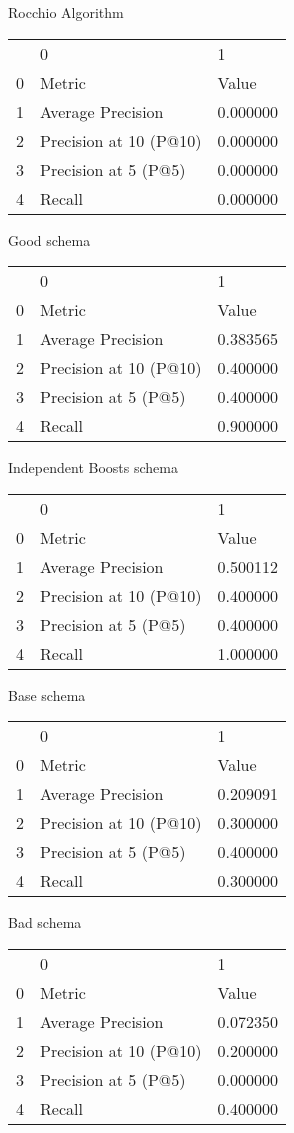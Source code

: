 

Rocchio Algorithm
\begin{tabular}{lll}
 & 0 & 1 \\
0 & Metric & Value \\
1 & Average Precision & 0.000000 \\
2 & Precision at 10 (P@10) & 0.000000 \\
3 & Precision at 5 (P@5) & 0.000000 \\
4 & Recall & 0.000000 \\
\end{tabular}


Good schema
\begin{tabular}{lll}
 & 0 & 1 \\
0 & Metric & Value \\
1 & Average Precision & 0.383565 \\
2 & Precision at 10 (P@10) & 0.400000 \\
3 & Precision at 5 (P@5) & 0.400000 \\
4 & Recall & 0.900000 \\
\end{tabular}


Independent Boosts schema
\begin{tabular}{lll}
 & 0 & 1 \\
0 & Metric & Value \\
1 & Average Precision & 0.500112 \\
2 & Precision at 10 (P@10) & 0.400000 \\
3 & Precision at 5 (P@5) & 0.400000 \\
4 & Recall & 1.000000 \\
\end{tabular}


Base schema
\begin{tabular}{lll}
 & 0 & 1 \\
0 & Metric & Value \\
1 & Average Precision & 0.209091 \\
2 & Precision at 10 (P@10) & 0.300000 \\
3 & Precision at 5 (P@5) & 0.400000 \\
4 & Recall & 0.300000 \\
\end{tabular}


Bad schema
\begin{tabular}{lll}
 & 0 & 1 \\
0 & Metric & Value \\
1 & Average Precision & 0.072350 \\
2 & Precision at 10 (P@10) & 0.200000 \\
3 & Precision at 5 (P@5) & 0.000000 \\
4 & Recall & 0.400000 \\
\end{tabular}
